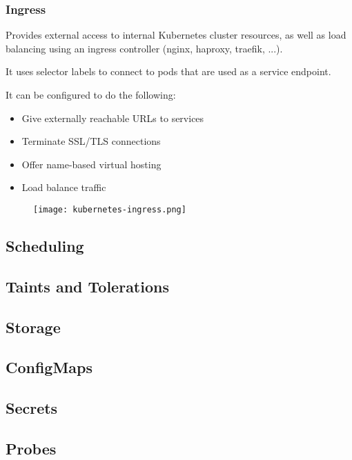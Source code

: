 \subsubsection{Ingress}
Provides external access to internal Kubernetes cluster resources, 
as well as load balancing using an ingress controller (nginx, haproxy, traefik, ...). 

It uses selector labels to connect to pods that are used as a service endpoint. 

It can be configured to do the following:

\begin{itemize}
    \item Give externally reachable URLs to services
    \item Terminate SSL/TLS connections
    \item Offer name-based virtual hosting
    \item Load balance traffic
\end{itemize}

\begin{figure}[h]
    \centering
    \texttt{[image: kubernetes-ingress.png]}
\end{figure}

\subsection{Scheduling}

\subsection{Taints and Tolerations}

\subsection{Storage}

\subsection{ConfigMaps}

\subsection{Secrets}

\subsection{Probes}

